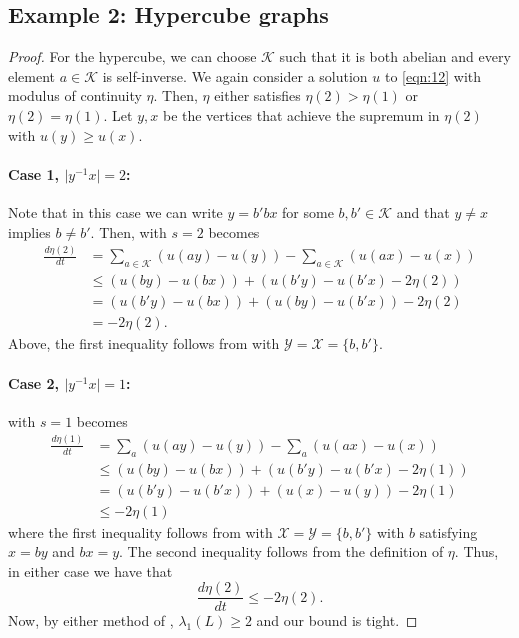 \subsection{Example 2: Hypercube graphs}\label{sec:hypercube}
\hypercube*
\begin{proof}
For the hypercube, we can choose $\mathcal{K}$ such that it is both abelian and every element $a \in \mathcal{K}$ is self-inverse. We again consider a solution $u$ to \cref{eqn:12} with modulus of continuity $\eta$. Then, $\eta$ either satisfies $\eta(2)>\eta(1)$ or $\eta(2)=\eta(1)$. Let $y,x$ be the vertices that achieve the supremum in $\eta(2)$ with $u(y)\geq u(x)$.

\paragraph{Case 1, $\lvert y^{-1}x\rvert=2$:} Note that in this case we can write $y = b' b x$ for some $b,b' \in \mathcal{K}$ and that $y\neq x$ implies $b \neq b'$. Then,  with $s =2$ becomes
\begin{align*}
 \frac{d\eta(2)}{dt} &= \sum_{a \in \mathcal{K}} \left(u(ay)-u(y) \right) - \sum_{a\in \mathcal{K}} \left(u(ax)-u(x) \right) \\
 &\leq (u(by)-u(bx)) + (u(b'y)-u(b'x) -2\eta(2)) \\
 &= (u(b'y) - u(bx)) + (u(by) - u(b'x)) - 2 \eta(2) \\
 & = -2 \eta(2).
\end{align*}
Above, the first inequality follows from  with $\mathcal{Y}=\mathcal{X}=\{b,b'\}$. 

\paragraph{Case 2, $\lvert y^{-1}x\rvert=1$:}  with $s=1$ becomes 
\begin{align*}
 \frac{d\eta(1)}{dt} &= \sum_a \left(u(ay)-u(y) \right) - \sum_a \left(u(ax)-u(x) \right) \\
 &\leq (u(by)-u(bx)) + (u(b'y)-u(b'x) -2\eta(1)) \\
 &= (u(b'y) - u(b'x)) + (u(x) - u(y)) - 2 \eta(1) \\
 & \leq -2 \eta(1)
\end{align*}
where the first inequality follows from  with $\mathcal{X}=\mathcal{Y}=\{b,b'\}$ with $b$ satisfying $x=by$ and $bx=y$. The second inequality follows from the definition of $\eta$. Thus, in either case we have that
\begin{equation}\label{eqn:hypercube_bound}
\frac{d\eta(2)}{dt} \leq -2 \eta(2).
\end{equation}
Now, by either method of , $\lambda_1(L) \geq 2$ and our bound is tight.
\end{proof}
